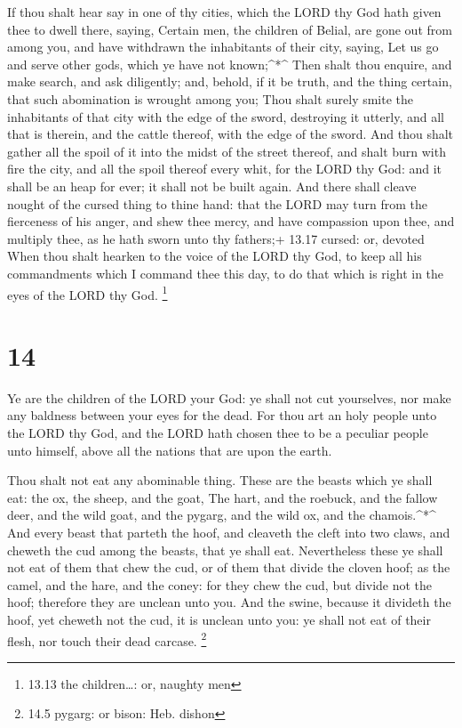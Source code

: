  If thou shalt hear say in one of thy cities, which the
LORD thy God hath given thee to dwell there, saying, 
Certain men, the children of Belial, are gone out from among you, and
have withdrawn the inhabitants of their city, saying, Let us go and
serve other gods, which ye have not known;\^{}*\^{}  Then
shalt thou enquire, and make search, and ask diligently; and, behold, if
it be truth, and the thing certain, that such abomination is wrought
among you;  Thou shalt surely smite the inhabitants of that
city with the edge of the sword, destroying it utterly, and all that is
therein, and the cattle thereof, with the edge of the sword.
 And thou shalt gather all the spoil of it into the midst
of the street thereof, and shalt burn with fire the city, and all the
spoil thereof every whit, for the LORD thy God: and it shall be an heap
for ever; it shall not be built again.  And there shall
cleave nought of the cursed thing to thine hand: that the LORD may turn
from the fierceness of his anger, and shew thee mercy, and have
compassion upon thee, and multiply thee, as he hath sworn unto thy
fathers;+ 13.17 cursed: or, devoted  When thou shalt
hearken to the voice of the LORD thy God, to keep all his commandments
which I command thee this day, to do that which is right in the eyes of
the LORD thy God. \footnote{13.13 the children\ldots: or, naughty men}

\hypertarget{section-13}{%
\section{14}\label{section-13}}

 Ye are the children of the LORD your God: ye shall not cut
yourselves, nor make any baldness between your eyes for the dead.
 For thou art an holy people unto the LORD thy God, and the
LORD hath chosen thee to be a peculiar people unto himself, above all
the nations that are upon the earth.

 Thou shalt not eat any abominable thing.  These
are the beasts which ye shall eat: the ox, the sheep, and the goat,
 The hart, and the roebuck, and the fallow deer, and the
wild goat, and the pygarg, and the wild ox, and the chamois.\^{}*\^{}
 And every beast that parteth the hoof, and cleaveth the
cleft into two claws, and cheweth the cud among the beasts, that ye
shall eat.  Nevertheless these ye shall not eat of them that
chew the cud, or of them that divide the cloven hoof; as the camel, and
the hare, and the coney: for they chew the cud, but divide not the hoof;
therefore they are unclean unto you.  And the swine, because
it divideth the hoof, yet cheweth not the cud, it is unclean unto you:
ye shall not eat of their flesh, nor touch their dead carcase.
\footnote{14.5 pygarg: or bison: Heb. dishon}

